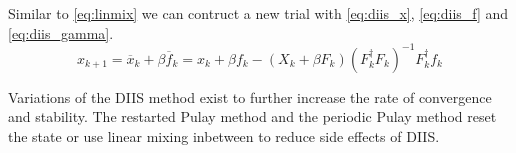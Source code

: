 Similar to \eqref{eq:linmix} we can contruct a new trial with \eqref{eq:diis_x}, \eqref{eq:diis_f} and \eqref{eq:diis_gamma}.
\begin{equation} \label{eq:diis_final}
x_{k+1} = \overline{x}_k + \beta \overline{f}_k = x_k + \beta f_k - (X_k + \beta F_k) (F_k^\dagger F_k)^{-1} F_k^\dagger f_k
\end{equation}

Variations of the DIIS method exist to further increase the rate of convergence and stability. The restarted Pulay method\cite{diis_restarted} and the periodic Pulay method\cite{diis_periodic} reset the state or use linear mixing inbetween to reduce side effects of DIIS.


